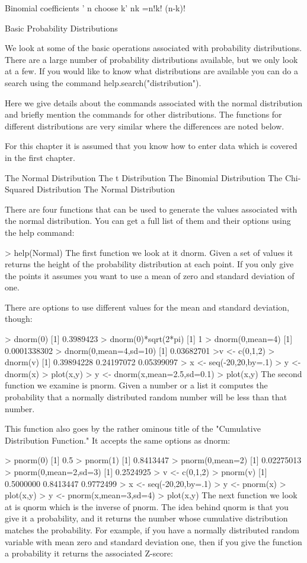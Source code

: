 \documentclass[a4paper,12pt]{article}
\begin{document}
Binomial coefficients
' n choose k'
nk =n!k! (n-k)!


Basic Probability Distributions

We look at some of the basic operations associated with probability distributions. There are a large number of probability distributions available, but we only look at a few. If you would like to know what distributions are available you can do a search using the command help.search("distribution").

Here we give details about the commands associated with the normal distribution and briefly mention the commands for other distributions. The functions for different distributions are very similar where the differences are noted below.

For this chapter it is assumed that you know how to enter data which is covered in the first chapter.

The Normal Distribution
The t Distribution
The Binomial Distribution
The Chi-Squared Distribution
The Normal Distribution

There are four functions that can be used to generate the values associated with the normal distribution. You can get a full list of them and their options using the help command:

> help(Normal)
The first function we look at it dnorm. Given a set of values it returns the height of the probability distribution at each point. If you only give the points it assumes you want to use a mean of zero and standard deviation of one. 

There are options to use different values for the mean and standard deviation, though:

> dnorm(0)
[1] 0.3989423
> dnorm(0)*sqrt(2*pi)
[1] 1
> dnorm(0,mean=4)    
[1] 0.0001338302
> dnorm(0,mean=4,sd=10)
[1] 0.03682701
>v <- c(0,1,2)
> dnorm(v)
[1] 0.39894228 0.24197072 0.05399097
> x <- seq(-20,20,by=.1)
> y <- dnorm(x) 
> plot(x,y)
> y <- dnorm(x,mean=2.5,sd=0.1) 
> plot(x,y)
The second function we examine is pnorm. Given a number or a list it computes the probability that a normally distributed random number will be less than that number. 

This function also goes by the rather ominous title of the "Cumulative Distribution Function." It accepts the same options as dnorm:

> pnorm(0)
[1] 0.5
> pnorm(1)
[1] 0.8413447
> pnorm(0,mean=2)
[1] 0.02275013
> pnorm(0,mean=2,sd=3)
[1] 0.2524925
> v <- c(0,1,2)         
> pnorm(v)
[1] 0.5000000 0.8413447 0.9772499
> x <- seq(-20,20,by=.1)
> y <- pnorm(x) 
> plot(x,y)
> y <- pnorm(x,mean=3,sd=4) 
> plot(x,y)
The next function we look at is qnorm which is the inverse of pnorm. The idea behind qnorm is that you give it a probability, and it returns the number whose cumulative distribution matches the probability. For example, if you have a normally distributed random variable with mean zero and standard deviation one, then if you give the function a probability it returns the associated Z-score:
\end{document}
